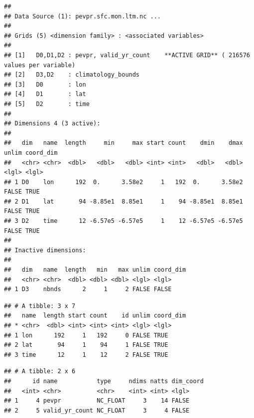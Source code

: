 \documentclass[krantz2]{krantz}\usepackage{knitr}
\begin{document}
\begin{knitrout}\footnotesize
{}\color{fgcolor}\begin{kframe}
\begin{alltt}
 \hlkwb{<-} \hlstd{(}\hlstd{)}
\end{alltt}
\begin{verbatim}
##
## Data Source (1): pevpr.sfc.mon.ltm.nc ...
##
## Grids (5) <dimension family> : <associated variables>
##
## [1]   D0,D1,D2 : pevpr, valid_yr_count    **ACTIVE GRID** ( 216576  values per variable)
## [2]   D3,D2    : climatology_bounds
## [3]   D0       : lon
## [4]   D1       : lat
## [5]   D2       : time
##
## Dimensions 4 (3 active):
##
##   dim   name  length     min     max start count    dmin    dmax unlim coord_dim
##   <chr> <chr>  <dbl>   <dbl>   <dbl> <int> <int>   <dbl>   <dbl> <lgl> <lgl>
## 1 D0    lon      192  0.      3.58e2     1   192  0.      3.58e2 FALSE TRUE
## 2 D1    lat       94 -8.85e1  8.85e1     1    94 -8.85e1  8.85e1 FALSE TRUE
## 3 D2    time      12 -6.57e5 -6.57e5     1    12 -6.57e5 -6.57e5 FALSE TRUE
##
## Inactive dimensions:
##
##   dim   name  length   min   max unlim coord_dim
##   <chr> <chr>  <dbl> <dbl> <dbl> <lgl> <lgl>
## 1 D3    nbnds      2     1     2 FALSE FALSE
\end{verbatim}
\end{kframe}
\end{knitrout}

\begin{knitrout}\footnotesize
{}\color{fgcolor}\begin{kframe}
\begin{alltt}
\end{alltt}
\begin{verbatim}
## # A tibble: 3 x 7
##   name  length start count    id unlim coord_dim
## * <chr>  <dbl> <int> <int> <int> <lgl> <lgl>
## 1 lon      192     1   192     0 FALSE TRUE
## 2 lat       94     1    94     1 FALSE TRUE
## 3 time      12     1    12     2 FALSE TRUE
\end{verbatim}
\end{kframe}
\end{knitrout}

\begin{knitrout}\footnotesize
{}\color{fgcolor}\begin{kframe}
\begin{alltt}
\end{alltt}
\begin{verbatim}
## # A tibble: 2 x 6
##      id name           type     ndims natts dim_coord
##   <int> <chr>          <chr>    <int> <int> <lgl>
## 1     4 pevpr          NC_FLOAT     3    14 FALSE
## 2     5 valid_yr_count NC_FLOAT     3     4 FALSE
\end{verbatim}
\end{kframe}
\end{knitrout}
\end{document}
